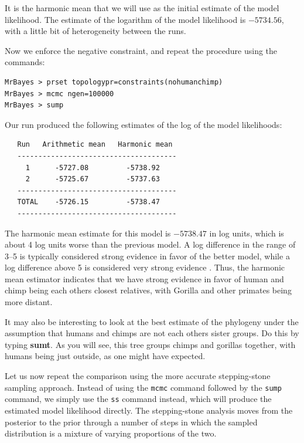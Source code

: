 \documentclass[12pt]{book}
\newcommand{\ttt}[1]{\texttt{#1} }
\begin{document}
It is the harmonic mean that we will use as the initial estimate of the model likelihood. The estimate of the logarithm
of the model likelihood is $-5734.56$, with a little bit of heterogeneity between the runs.

Now we enforce the negative constraint, and repeat the procedure using the commands:

\begin{singlespacing}
\begin{verbatim}
MrBayes > prset topologypr=constraints(nohumanchimp)
MrBayes > mcmc ngen=100000
MrBayes > sump
\end{verbatim}
\end{singlespacing}

Our run produced the following estimates of the log of the model likelihoods:

\begin{singlespacing}
\begin{verbatim}
   Run   Arithmetic mean   Harmonic mean
   --------------------------------------
     1      -5727.08         -5738.92
     2      -5725.67         -5737.63
   --------------------------------------
   TOTAL    -5726.15         -5738.47
   --------------------------------------
\end{verbatim}
\end{singlespacing}

The harmonic mean estimate for this model is $-5738.47$ in log units, which is about 4 log units worse than the
previous model. A log difference in the range of 3--5 is typically considered strong evidence in favor of the 
better model, while a log difference above 5 is considered very strong evidence \citep{kass95}. Thus,
the harmonic mean estimator indicates that we have strong evidence in favor of human and chimp being
each others closest relatives, with Gorilla and other primates being more distant.

It may also be interesting to look at the best estimate of the phylogeny under the assumption that humans and
chimps are not each others sister groups. Do this by typing \textbf{sumt}. As you will see, this tree groups
chimps and gorillas together, with humans being just outside, as one might have expected.

Let us now repeat the comparison using the more accurate stepping-stone sampling approach. Instead of using the
\ttt{mcmc} command followed by the \ttt{sump} command, we simply use the \ttt{ss} command instead,
which will produce the estimated model likelihood directly. The
stepping-stone analysis moves from the posterior to the prior through a number of steps in which the sampled
distribution is a mixture of varying proportions of the two.
\end{document}

